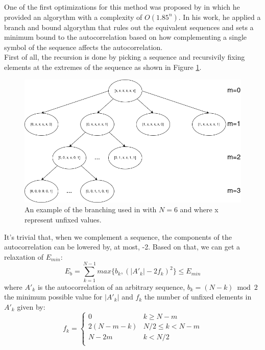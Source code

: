   One of the first optimizations for this method was
  proposed by \citet{Mertens_1996} in which he provided an algorythm
  with a complexity of $O(1.85^n)$. In his work, he applied a branch and bound
  algorythm that rules out the equivalent sequences and sets a minimum bound
  to the autocorrelation based on how complementing a single symbol of the
  sequence affects the autocorrelation.\\

  First of all, the recursion is done by picking a sequence and recursivily
  fixing elements at the extremes of the sequence as shown in Figure
  \ref{prn_search:fig:1}.\\

  \begin{figure}[ht!]
    \includegraphics[scale=0.6]{Chapters/prn_search/branching_example.png}
    \caption{An example of the branching used in \citet{Mertens_1996} with
    $N = 6$ and where x represent unfixed values.}
    \label{prn_search:fig:1}
  \end{figure}

  It's trivial that, when we complement a sequence, the components of the
  autocorrelation can be lowered by, at most, -2. Based on that, we can get a
  relaxation of $E_{min}$:\\
  \begin{equation}
    E_b = \sum_{k=1}^{N-1}max\{b_k, (|A'_k| - 2f_k)^2\} \leq E_{min}
  \end{equation}
  where $A'_k$ is the autocorrelation of an arbitrary sequence, $b_k = (N -
  k) \bmod 2$ the minimum possible value for $|A'_k|$ and $f_k$ the number of
  unfixed elements in $A'_k$ given by:
  \begin{equation}
    f_k = \left\{\begin{array}{ll}
        0 & k \geq N - m \\
        2(N - m - k) & N/2 \leq k < N - m\\
        N - 2m & k < N/2 \\
    \end{array}\right.
  \end{equation}

